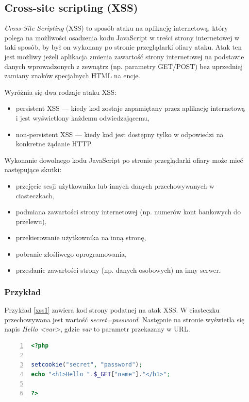 \documentclass[11pt,a4paper,polish,thesis,oneside]{dcsbook}
\begin{document}
\subsection{Cross-site scripting (XSS)}
\textit{Cross-Site Scripting} (XSS) to sposób ataku na aplikację internetową, który polega na możliwości osadzenia kodu JavaScript w treści strony internetowej w taki sposób, by był on wykonany po stronie przeglądarki ofiary ataku. Atak ten jest możliwy jeżeli aplikacja zmienia zawartość strony internetowej na podstawie danych wprowadzonych z zewnątrz (np. parametry GET/POST) bez uprzedniej zamiany znaków specjalnych HTML na encje. 

Wyróżnia się dwa rodzaje ataku XSS:
\begin{itemize}
\item persistent XSS --- kiedy kod zostaje zapamiętany przez aplikację internetową i jest wyświetlony każdemu odwiedzającemu,
\item non-persistent XSS --- kiedy kod jest dostępny tylko w odpowiedzi na konkretne żądanie HTTP.
\end{itemize}

Wykonanie dowolnego kodu JavaScript po stronie przeglądarki ofiary może mieć następujące skutki:
\begin{itemize}
\item przejęcie sesji użytkownika lub innych danych przechowywanych w ciasteczkach,
\item podmiana zawartości strony internetowej (np. numerów kont bankowych do przelewu),
\item przekierowanie użytkownika na inną stronę,
\item pobranie złośliwego oprogramowania,
\item przesłanie zawartości strony (np. danych osobowych) na inny serwer.
\end{itemize}

\subsubsection*{Przykład}
Przykład \ref{xss1} zawiera kod strony podatnej na atak XSS. W ciasteczku przechowywana jest wartość \textit{secret=password}. Następnie na stronie wyświetla się napis \textit{Hello <var>}, gdzie \textit{var} to parametr przekazany w URL.

\begin{lstlisting}[language=php,frame=single,caption=przykładowy kod strony podatnej na XSS,label=xss1,numbers=left]
<?php

setcookie("secret", "password");
echo "<h1>Hello ".$_GET["name"]."</h1>";

?>
\end{lstlisting}
\end{document}
